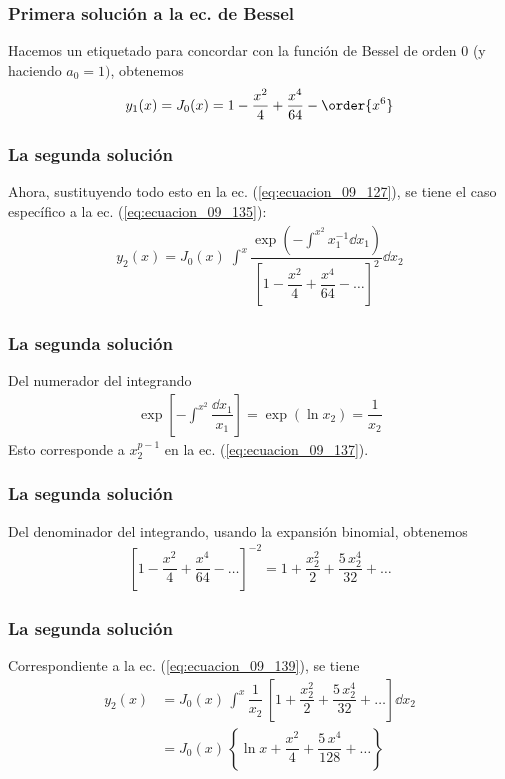 \begin{frame}
\frametitle{Primera solución a la ec. de Bessel}
Hacemos un etiquetado para concordar con la función de Bessel de orden $0$ (y haciendo $a_{0} = 1)$, obtenemos
\begin{align}
y_{1} (x) = J_{0} (x) =  1 - \dfrac{x^{2}}{4} + \dfrac{x^{4}}{64} - \order{x^{6}}
\label{eq:ecuacion_09_142a}
\end{align}
\end{frame}
\begin{frame}
\frametitle{La segunda solución}
Ahora, sustituyendo todo esto en la ec. (\ref{eq:ecuacion_09_127}), se tiene el caso específico a la ec. (\ref{eq:ecuacion_09_135}):
\begin{align}
y_{2} (x) = J_{0} (x) \; \int^{x} \dfrac{\exp(\displaystyle - \int^{x^{2}} x_{1}^{-1} \dd{x_{1}})}{\left[ 1 - \dfrac{x^{2}}{4} + \dfrac{x^{4}}{64} - \ldots\right]^{2}} \dd{x_{2}}
\label{eq:ecuacion_09_142b}
\end{align}
\end{frame}
\begin{frame}
\frametitle{La segunda solución}
Del numerador del integrando
\begin{align*}
\exp \left[ - \int^{x^{2}} \dfrac{\dd{x_{1}}}{x_{1}} \right]= \exp (\ln x_{2}) = \dfrac{1}{x_{2}} 
\end{align*}
Esto corresponde a $x_{2}^{p-1}$ en la ec. (\ref{eq:ecuacion_09_137}).
\end{frame}
\begin{frame}
\frametitle{La segunda solución}
Del denominador del integrando, usando la expansión binomial, obtenemos
\begin{align*}
\left[ 1 - \dfrac{x^{2}}{4} + \dfrac{x^{4}}{64} - \ldots \right]^{-2} = 1 + \dfrac{x_{2}^{2}}{2} + \dfrac{5 \, x_{2}^{4}}{32} + \ldots
\end{align*}
\end{frame}
\begin{frame}
\frametitle{La segunda solución}
Correspondiente a la ec. (\ref{eq:ecuacion_09_139}), se tiene
\begin{align}
y_{2} (x) &= J_{0} (x) \, \int^{x} \dfrac{1}{x_{2}} \, \left[ 1 + \dfrac{x_{2}^{2}}{2} + \dfrac{5 \, x_{2}^{4}}{32} + \ldots \right] \dd{x_{2}} \nonumber \\[0.5em]
&= J_{0} (x) \, \left\{ \ln x + \dfrac{x^{2}}{4} + \dfrac{5 \, x^{4}}{128} + \ldots  \right\}
\label{eq:ecuacion_09_142c}
\end{align}
\end{frame}
